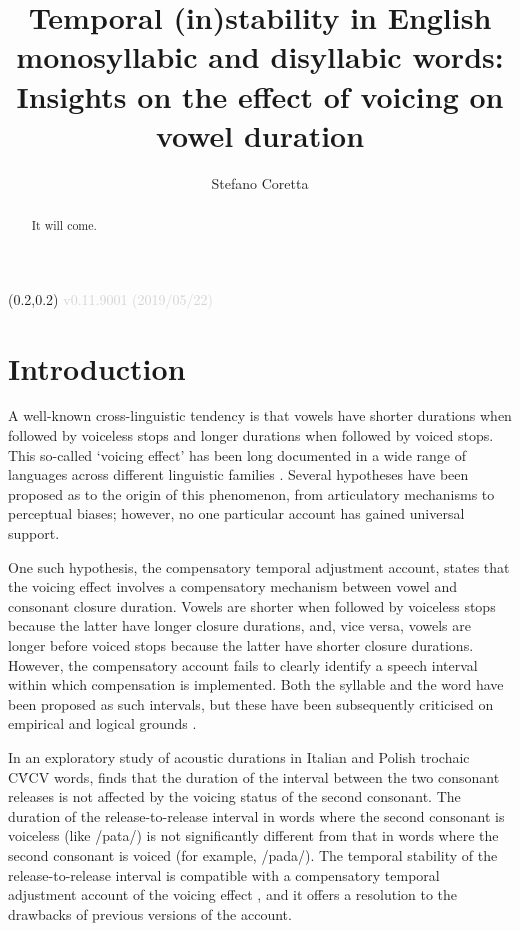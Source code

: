\documentclass[
  12pt,
  a4paper,
]{article}
\title{Temporal (in)stability in English monosyllabic and disyllabic words:
Insights on the effect of voicing on vowel duration}
\author{Stefano Coretta}
\date{}
\begin{document}
\begin{textblock}{3}(0.2,0.2)
  \textcolor{lightgray}{v0.11.9001 (2019/05/22)}
\end{textblock}
\maketitle

\begin{abstract}
It will come.
\end{abstract}

\hypertarget{introduction}{%
\section{Introduction}\label{introduction}}

\label{s:intro}

A well-known cross-linguistic tendency is that vowels have shorter
durations when followed by voiceless stops and longer durations when
followed by voiced stops. This so-called `voicing effect' has been long
documented in a wide range of languages across different linguistic
families \citep{maddieson1976, begus2017}. Several hypotheses have been
proposed as to the origin of this phenomenon, from articulatory
mechanisms to perceptual biases; however, no one particular account has
gained universal support.

One such hypothesis, the compensatory temporal adjustment account,
states that the voicing effect involves a compensatory mechanism between
vowel and consonant closure duration. Vowels are shorter when followed
by voiceless stops because the latter have longer closure durations,
and, vice versa, vowels are longer before voiced stops because the
latter have shorter closure durations. However, the compensatory account
fails to clearly identify a speech interval within which compensation is
implemented. Both the syllable \citep{lindblom1967, farnetani1986} and
the word \citep{slis1969, slis1969a, lehiste1970a, lehiste1970} have
been proposed as such intervals, but these have been subsequently
criticised on empirical and logical grounds
\citep{chen1970, jacewicz2009, maddieson1976, coretta2018j}.

In an exploratory study of acoustic durations in Italian and Polish
trochaic CV́CV words, \citet{coretta2018j} finds that the duration of the
interval between the two consonant releases is not affected by the
voicing status of the second consonant. The duration of the
release-to-release interval in words where the second consonant is
voiceless (like /pata/) is not significantly different from that in
words where the second consonant is voiced (for example, /pada/). The
temporal stability of the release-to-release interval is compatible with
a compensatory temporal adjustment account of the voicing effect
\citep{lindblom1967, slis1969, slis1969a, lehiste1970a, lehiste1970},
and it offers a resolution to the drawbacks of previous versions of the
account.
\end{document}
